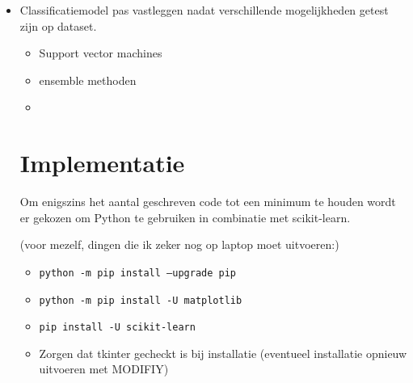 \begin{itemize}
\begin{itemize}
	\end{itemize}
	\item Classificatiemodel pas vastleggen nadat verschillende mogelijkheden getest zijn op dataset.
	\begin{itemize}
		\item Support vector machines
		\item ensemble methoden
		\item {}
	\end{itemize}


\section{Implementatie}
Om enigszins het aantal geschreven code tot een minimum te houden wordt er gekozen om Python te gebruiken in combinatie met scikit-learn.

(voor mezelf, dingen die ik zeker nog op laptop moet uitvoeren:)
\begin{itemize}
	\item \texttt{python -m pip install --upgrade pip}
	\item \texttt{python -m pip install -U matplotlib}
	\item \texttt{pip install -U scikit-learn}
	\item Zorgen dat tkinter gecheckt is bij installatie (eventueel installatie opnieuw uitvoeren met MODIFIY)
\end{itemize}
\end{itemize}
